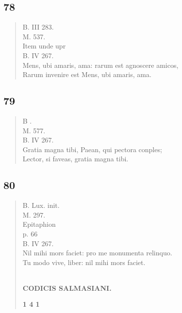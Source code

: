 \documentclass[11pt, a4paper]{report}
\begin{document}
            \subsection*{78}
      \begin{verse}
      B. III 283. \\ M. 537. \\ Item unde upr \\ B. IV 267. \\ Mens, ubi amaris, ama: rarum est agnoscere amicos, \\ Rarum invenire  \lbrack est \rbrack  Mens, ubi amaris, ama. \\ 
      \end{verse}
  
            \subsection*{79}
      \begin{verse}
      B . \\ M. 577. \\ B. IV 267. \\ Gratia magna tibi, Paean, qui pectora conples; \\ Lector, si faveas, gratia magna tibi. \\ 
      \end{verse}
  
            \subsection*{80}
      \begin{verse}
      B. Lux. init. \\ M. 297. \\ Epitaphion \\ p. 66 \\ B. IV 267. \\ Nil mihi mors faciet: pro me monumenta relinquo. \\ Tu modo vive, liber: nil mihi mors faciet. \\ 
        ﻿\pagebreak 
    \begin{center} \textbf{CODICIS SALMASIANI.} \end{center}\begin{center} \textbf{1 4 1} \end{center}
      \end{verse}
  
\end{document}
